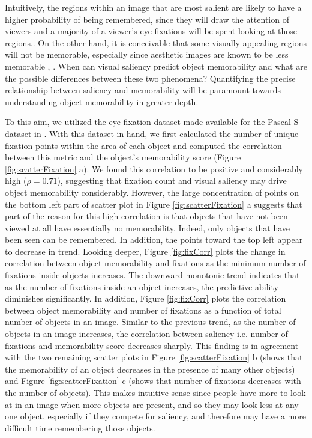 Intuitively, the regions within an image that are most salient are likely to have a higher probability of being remembered, since they will draw the attention of viewers and a majority of a viewer’s eye fixations will be spent looking at those regions.. On the other hand, it is conceivable that some visually appealing regions will not be memorable, especially since aesthetic images are known to be less memorable \cite{isola11}, \cite{isola14}. When can visual saliency predict object memorability and what are the possible differences between these two phenomena? Quantifying the precise relationship between saliency and memorability will be paramount  towards understanding object memorability in greater depth.

To this aim, we utilized the eye fixation dataset made available for the Pascal-S dataset in \cite{yin14}. With this dataset in hand, we first calculated the number of unique fixation points within the area of each object and computed the correlation between this metric and the object’s memorability score (Figure \ref{fig:scatterFixation} a). We found this correlation to be positive and considerably high ($\rho = 0.71$), suggesting that fixation count and visual saliency may drive object memorability considerably. However, the large concentration of points on the bottom left part of scatter plot in Figure \ref{fig:scatterFixation} a suggests that part of the reason for this high correlation is that objects that have not been viewed at all have essentially no memorability. Indeed, only objects that have been seen can be remembered. In addition, the points toward the top left appear to decrease in trend. Looking deeper, Figure \ref{fig:fixCorr} plots the change in correlation between object memorability and fixations as the minimum number of fixations inside objects increases. The downward monotonic trend indicates that as the number of fixations inside an object increases, the predictive ability diminishes significantly. In addition, Figure \ref{fig:fixCorr} plots the correlation between object memorability and number of fixations as a function of total number of objects in an image. Similar to the previous trend, as the number of objects in an image increases, the correlation between saliency i.e. number of fixations and memorability score decreases sharply. This finding is in agreement with the two remaining scatter plots in Figure \ref{fig:scatterFixation} b (shows that the memorability of an object decreases in the presence of many other objects) and Figure \ref{fig:scatterFixation} c (shows that number of fixations decreases with the number of objects). This makes intuitive sense since people have more to look at in an image when more objects are present, and so they may look less at any one object, especially if they compete for saliency, and therefore may have a more difficult time remembering those objects.

